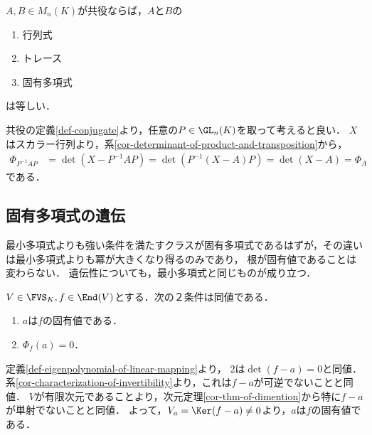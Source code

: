 \documentclass[uplatex, dvipdfmx]{jsreport}
\begin{document}
\begin{proposition}\label{prop-行列の特徴量は線型写像について定まっている}
    $A,B\in M_n(K)$が共役ならば，$A$と$B$の
    \begin{enumerate}
        \item 行列式
        \item トレース
        \item 固有多項式
    \end{enumerate}
    は等しい．
\end{proposition}
\begin{Proof}
    共役の定義\ref{def-conjugate}より，任意の$P\in\GL_n(K)$を取って考えると良い．
    $X$はスカラー行列より，系\ref{cor-determinant-of-product-and-transposition}から，
    \begin{align*}
        \Phi_{P^{-1}AP}&=\det(X-P^{-1}AP)=\det(P^{-1}(X-A)P)=\det(X-A)=\Phi_A
    \end{align*}
    である．
\end{Proof}

\subsection{固有多項式の遺伝}

\begin{tcolorbox}[colframe=ForestGreen, colback=ForestGreen!10!white, breakable]
    最小多項式よりも強い条件を満たすクラスが固有多項式であるはずが，その違いは最小多項式よりも冪が大きくなり得るのみであり，
    根が固有値であることは変わらない．
    遺伝性についても，最小多項式と同じものが成り立つ．
\end{tcolorbox}

\begin{proposition}[固有値であることの特徴付け]
    $V\in\FVS_K,f\in\End(V)$とする．次の２条件は同値である．
    \begin{enumerate}
        \item $a$は$f$の固有値である．
        \item $\Phi_f(a)=0$．
    \end{enumerate}
\end{proposition}
\begin{Proof}
    定義\ref{def-eigenpolynomial-of-linear-mapping}より，
    2は$\det(f-a)=0$と同値．系\ref{cor-characterization-of-invertibility}より，これは$f-a$が可逆でないことと同値．
    $V$が有限次元であることより，次元定理\ref{cor-thm-of-dimention}から特に$f-a$が単射でないことと同値．
    よって，$V_a=\Ker(f-a)\ne 0$より，$a$は$f$の固有値である．
\end{Proof}
\end{document}
